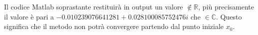 
\begin{flushleft}
Il codice Matlab soprastante restituirà in output un valore $\notin \mathbb{R}$, più precisamente il valore è pari a $-0.010239076641281 + 0.028100085752476i$ che $\in \mathbb{C}$. Questo significa che il metodo non potrà convergere partendo dal punto iniziale $x_0$. 
\end{flushleft}